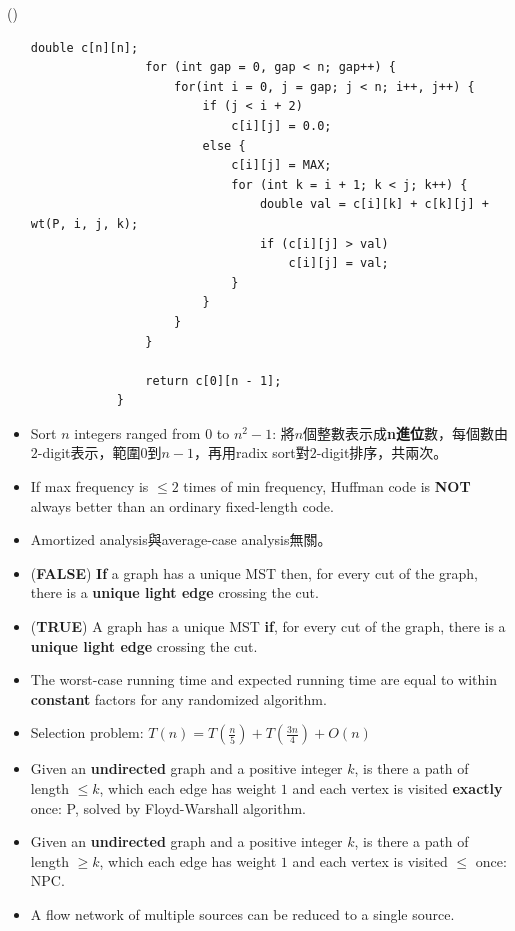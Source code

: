 \begin{theorem}{()}
\begin{itemize}
\begin{lstlisting}[caption={Minimum triangulation.}, captionpos=b]
                double c[n][n];
                for (int gap = 0, gap < n; gap++) {
                    for(int i = 0, j = gap; j < n; i++, j++) {
                        if (j < i + 2)
                            c[i][j] = 0.0;
                        else {
                            c[i][j] = MAX;
                            for (int k = i + 1; k < j; k++) {
                                double val = c[i][k] + c[k][j] + wt(P, i, j, k);
                                if (c[i][j] > val)
                                    c[i][j] = val;
                            }
                        }
                    }
                }

                return c[0][n - 1];
            }
        \end{lstlisting}
        \item Sort $n$ integers ranged from $0$ to $n^2 - 1$: 將$n$個整數表示成\textbf{n進位}數，每個數由$2$-digit表示，範圍$0$到$n - 1$，再用radix sort對$2$-digit排序，共兩次。
        \item If max frequency is $\le 2$ times of min frequency, Huffman code is \textbf{NOT} always better than an ordinary fixed-length code.
        \item Amortized analysis與average-case analysis無關。
        \item (\textbf{FALSE}) \textbf{If} a graph has a unique MST then, for every cut of the graph, there is a \textbf{unique light edge} crossing the cut.
        \item (\textbf{TRUE}) A graph has a unique MST \textbf{if}, for every cut of the graph, there is a \textbf{unique light edge} crossing the cut.
        \item The worst-case running time and expected running time are equal to within \textbf{constant} factors for any randomized algorithm.
        \item Selection problem: $T(n) = T(\frac{n}{5}) + T(\frac{3n}{4}) + O(n)$
        \item Given an \textbf{undirected} graph and a positive integer $k$, is there a path of length $\le k$, which each edge has weight $1$ and each vertex is visited \textbf{exactly} once: P, solved by Floyd-Warshall algorithm.
        \item Given an \textbf{undirected} graph and a positive integer $k$, is there a path of length $\ge k$, which each edge has weight $1$ and each vertex is visited $\le$ once: NPC.
        \item A flow network of multiple sources can be reduced to a single source.

\end{itemize}
\end{theorem}
